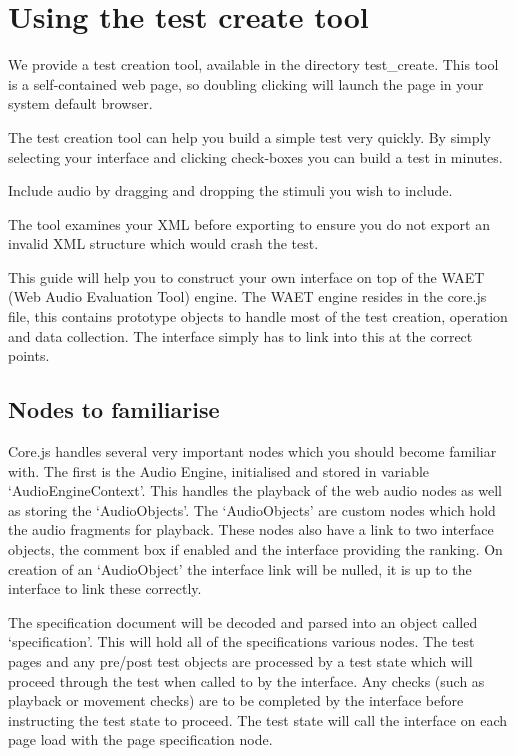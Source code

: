 \documentclass[11pt, oneside]{article}   	%
\begin{document}
\clearpage


\section{Using the test create tool}
	We provide a test creation tool, available in the directory test\_create. This tool is a self-contained web page, so doubling clicking will launch the page in your system default browser.

	The test creation tool can help you build a simple test very quickly. By simply selecting your interface and clicking check-boxes you can build a test in minutes.

	Include audio by dragging and dropping the stimuli you wish to include. 

	The tool examines your XML before exporting to ensure you do not export an invalid XML structure which would crash the test.
	
	This guide will help you to construct your own interface on top of the WAET (Web Audio Evaluation Tool) engine. The WAET engine resides in the core.js file, this contains prototype objects to handle most of the test creation, operation and data collection. The interface simply has to link into this at the correct points.

	\subsection{Nodes to familiarise}
		Core.js handles several very important nodes which you should become familiar with. The first is the Audio Engine, initialised and stored in variable `AudioEngineContext'. This handles the playback of the web audio nodes as well as storing the `AudioObjects'. The `AudioObjects' are custom nodes which hold the audio fragments for playback. These nodes also have a link to two interface objects, the comment box if enabled and the interface providing the ranking. On creation of an `AudioObject' the interface link will be nulled, it is up to the interface to link these correctly.

		The specification document will be decoded and parsed into an object called `specification'. This will hold all of the specifications various nodes. The test pages and any pre/post test objects are processed by a test state which will proceed through the test when called to by the interface. Any checks (such as playback or movement checks) are to be completed by the interface before instructing the test state to proceed. The test state will call the interface on each page load with the page specification node.
\end{document}
